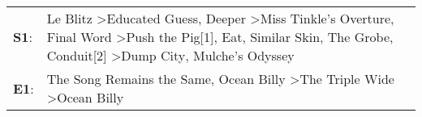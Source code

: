 \begin{supertabular}{p{0.03\textwidth}p{0.92\textwidth}}
 \textbf{S1}:  &  Le Blitz\textsuperscript{} \textgreater \enspace Educated Guess\textsuperscript{}, \enspace Deeper\textsuperscript{} \textgreater \enspace Miss Tinkle's Overture\textsuperscript{}, \enspace Final Word\textsuperscript{} \textgreater \enspace Push the Pig[1]\textsuperscript{}, \enspace Eat\textsuperscript{}, \enspace Similar Skin\textsuperscript{}, \enspace The Grobe\textsuperscript{}, \enspace Conduit[2]\textsuperscript{} \textgreater \enspace Dump City\textsuperscript{}, \enspace Mulche's Odyssey\textsuperscript{}  \enspace  \\
 \textbf{E1}:  &                                                                                                                                                                                                                                                                                                                                          The Song Remains the Same\textsuperscript{}, \enspace Ocean Billy\textsuperscript{} \textgreater \enspace The Triple Wide\textsuperscript{} \textgreater \enspace Ocean Billy\textsuperscript{}  \enspace  \\
\end{supertabular}
